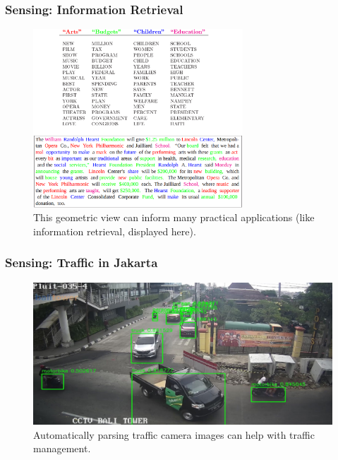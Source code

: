 \documentclass[10pt,mathserif]{beamer}
\begin{document}
\begin{frame}
  \frametitle{Sensing: Information Retrieval}
  \begin{figure}[ht]
    \centering
    \includegraphics[width=0.7\textwidth]{figures/topics}
    \caption{This geometric view can inform many practical applications (like
      information retrieval, displayed here).\label{fig:topics} }
  \end{figure}
\end{frame}

\begin{frame}
  \frametitle{Sensing: Traffic in Jakarta}
  \begin{figure}[ht]
    \centering
    \includegraphics[width=0.9\paperwidth]{figures/jakarta_traffic}
    \caption{Automatically parsing traffic camera images can help with traffic
      management. \citep{caldeira2018improving} \label{fig:jakarta} }
  \end{figure}
\end{frame}
\end{document}

